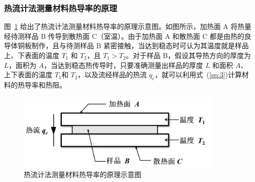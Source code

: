 \documentclass[a4paper,utf8]{article}
\newcommand{\fgref}[1]{图~\ref{#1} }
\newcommand{\seqref}[1]{式~(\ref{#1})}
\begin{document}
        \subsubsection{热流计法测量材料热导率的原理}
            \fgref{fg:1} 给出了热流计法测量材料热导率的原理示意图。如图所示，加热面 A 将热量经待测样品 B 传导到散热面 C（室温）。由于加热面 A 和散热面 C 都是由热的良导体铜板制作，且与待测样品 B 紧密接触，当达到稳态时可认为其温度就是样品上、下表面的温度 $T_1$ 和 $T_2$，且 $T_1 > T_2$。对于样品 B，假设其导热方向的厚度为 $L$，面积为 $A$，当达到稳态热传导时，只要准确测量出样品的厚度 $L$ 和面积 $A$、上下表面的温度 $T_1$和 $T_2$，以及流经样品的热流 $q_c$，就可以利用\seqref{eq:3}计算材料的热导率和热阻。
            \begin{figure}[!ht]\centering
                \includegraphics[width=100mm]{fg1.png}
                \caption{热流计法测量材料热导率的原理示意图 \label{fg:1}}
            \end{figure}
\end{document}
